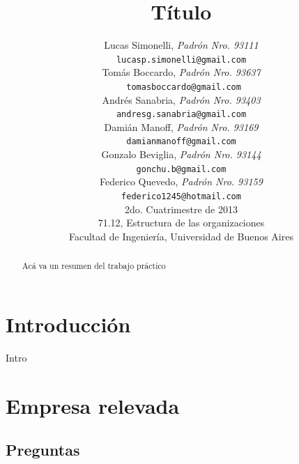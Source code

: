 \documentclass[a4paper,10pt]{article}
\title{		\textbf{Título}}
\author{	Lucas Simonelli, \textit{Padrón Nro. 93111}                     \\
            \texttt{ lucasp.simonelli@gmail.com }                                              \\[2.5ex]
            Tomás Boccardo, \textit{Padrón Nro. 93637}                     \\
            \texttt{ tomasboccardo@gmail.com}                                              \\[2.5ex]
            Andrés Sanabria, \textit{Padrón Nro. 93403}                     \\
            \texttt{ andresg.sanabria@gmail.com  }                                              \\[2.5ex]
            Dami\'an Manoff, \textit{Padrón Nro. 93169}                     \\
            \texttt{ damianmanoff@gmail.com  }                                              \\[2.5ex]
            Gonzalo Beviglia, \textit{Padrón Nro. 93144}                     \\
            \texttt{ gonchu.b@gmail.com  }                                              \\[2.5ex]
            Federico Quevedo, \textit{Padrón Nro. 93159}                     \\
            \texttt{ federico1245@hotmail.com  }                                              \\[2.5ex]
            \normalsize{2do. Cuatrimestre de 2013}                                      \\
            \normalsize{71.12, Estructura de las organizaciones}  \\
            \normalsize{Facultad de Ingeniería, Universidad de Buenos Aires}            \\
       }
\date{}
\begin{document}
\maketitle
\thispagestyle{empty}   %



\begin{abstract}
Acá va un resumen del trabajo práctico
\end{abstract}

\newpage
\tableofcontents
\newpage
\section{Introducción}
Intro
\section{Empresa relevada}
	\subsection{Preguntas}
\end{document}
